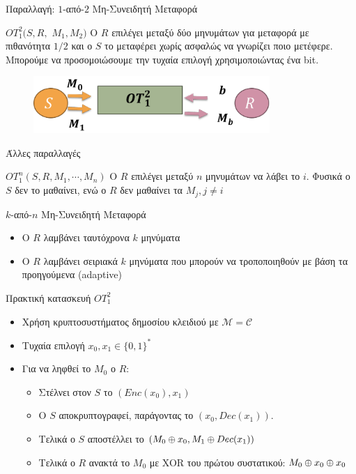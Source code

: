 \documentclass[handout]{beamer}
\begin{document}
\begin{frame}{Παραλλαγή: $1$-από-$2$ Μη-Συνειδητή Μεταφορά}
\begin{block}{$OT_1^2(S,R,$ $M_1,M_2)$}
	O $R$ επιλέγει μεταξύ δύο μηνυμάτων για μεταφορά με πιθανότητα ${1}/{2}$ και ο $S$ το μεταφέρει χωρίς ασφαλώς  να γνωρίζει ποιο μετέφερε. Μπορούμε να προσομοιώσουμε την τυχαία επιλογή χρησιμοποιώντας ένα bit.
\end{block}
\begin{figure}
	\centering
	\includegraphics[width=0.8\textwidth]{ot12.png}
\end{figure}
\end{frame}

\begin{frame}{Άλλες παραλλαγές}
	\begin{block}{$OT_1^n(S,R,M_1,\cdots,M_n)$}
		O $R$ επιλέγει μεταξύ $n$ μηνυμάτων να λάβει το $i$. Φυσικά ο $S$ δεν το μαθαίνει, ενώ ο $R$ δεν μαθαίνει τα $M_j, j \neq i$
	\end{block}	

	$k$-από-$n$ Μη-Συνειδητή Μεταφορά
	\begin{itemize}
			\item O $R$ λαμβάνει ταυτόχρονα $k$ μηνύματα
			\item O $R$ λαμβάνει σειριακά $k$ μηνύματα που μπορούν να τροποποιηθούν με βάση τα προηγούμενα (adaptive)
	\end{itemize}
\end{frame} 

\begin{frame}{Πρακτική κατασκευή $OT_1^2$}
	\begin{itemize}
	\item Χρήση κρυπτοσυστήματος δημοσίου κλειδιού με $\mathcal{M} = \mathcal{C}$
	\item Τυχαία επιλογή  $x_0, x_1 \in \{0,1\}^*$ 
	\item Για να ληφθεί το $M_0$ ο $R$:
	\begin{itemize}
		\item Στέλνει στον $S$ το $(Enc(x_0),x_1)$
		\item Ο $S$ αποκρυπτογραφεί, παράγοντας το $(x_0, Dec(x_1))$.  
		\item Τελικά ο $S$ αποστέλλει το $(M_0 \oplus x_0, M_1 \oplus Dec(x_1))$
		\item Τελικά ο $R$ ανακτά το $M_0$ με XOR του πρώτου συστατικού: $M_0 \oplus x_0 \oplus x_0$
	\end{itemize}
	\end{itemize}
\end{frame}
\end{document}
